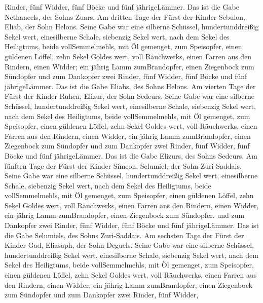 Rinder, fünf Widder, fünf Böcke und fünf jährigeLämmer. Das ist die Gabe
Nethaneels, des Sohns Zuars.  Am dritten Tage der Fürst der
Kinder Sebulon, Eliab, der Sohn Helons.  Seine Gabe war
eine silberne Schüssel, hundertunddreißig Sekel wert, einesilberne
Schale, siebenzig Sekel wert, nach dem Sekel des Heiligtums, beide
vollSemmelmehls, mit Öl gemenget, zum Speisopfer,  einen
güldenen Löffel, zehn Sekel Goldes wert, voll Räuchwerks, 
einen Farren aus den Rindern, einen Widder; ein jährig Lamm
zumBrandopfer,  einen Ziegenbock zum Sündopfer
 und zum Dankopfer zwei Rinder, fünf Widder, fünf Böcke und
fünf jährigeLämmer. Das ist die Gabe Eliabs, des Sohns Helons.
 Am vierten Tage der Fürst der Kinder Ruhen, Elizur, der
Sohn Sedeurs.  Seine Gabe war eine silberne Schüssel,
hundertunddreißig Sekel wert, einesilberne Schale, siebenzig Sekel wert,
nach dem Sekel des Heiligtums, beide vollSemmelmehls, mit Öl gemenget,
zum Speisopfer,  einen güldenen Löffel, zehn Sekel Goldes
wert, voll Räuchwerks,  einen Farren aus den Rindern, einen
Widder, ein jährig Lamm zumBrandopfer,  einen Ziegenbock
zum Sündopfer  und zum Dankopfer zwei Rinder, fünf Widder,
fünf Böcke und fünf jährigeLämmer. Das ist die Gabe Elizurs, des Sohns
Sedeurs.  Am fünften Tage der Fürst der Kinder Simeon,
Selumiel, der Sohn Zuri-Saddais.  Seine Gabe war eine
silberne Schüssel, hundertunddreißig Sekel wert, einesilberne Schale,
siebenzig Sekel wert, nach dem Sekel des Heiligtums, beide
vollSemmelmehls, mit Öl gemenget, zum Speisopfer,  einen
güldenen Löffel, zehn Sekel Goldes wert, voll Räuchwerks, 
einen Farren ans den Rindern, einen Widder, ein jährig Lamm
zumBrandopfer,  einen Ziegenbock zum Sündopfer.
 und zum Dankopfer zwei Rinder, fünf Widder, fünf Böcke und
fünf jährigeLämmer. Das ist die Gabe Selumiels, des Sohns Zuri-Saddais.
 Am sechsten Tage der Fürst der Kinder Gad, Eliasaph, der
Sohn Deguels.  Seine Gabe war eine silberne Schüssel,
hundertunddreißig Sekel wert, einesilberne Schale, siebenzig Sekel wert,
nach dem Sekel des Heiligtums, beide vollSemmelmehls, mit Öl gemenget,
zum Speisopfer,  einen güldenen Löffel, zehn Sekel Goldes
wert, voll Räuchwerks,  einen Farren aus den Rindern, einen
Widder, ein jährig Lamm zumBrandopfer,  einen Ziegenbock
zum Sündopfer  und zum Dankopfer zwei Rinder, fünf Widder,
